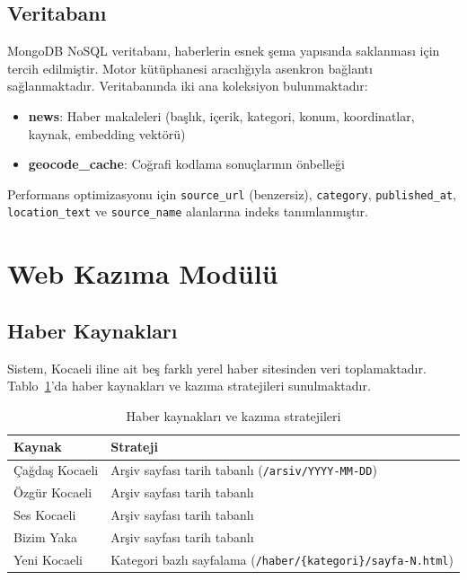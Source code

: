 \documentclass[conference]{IEEEtran}
\begin{document}
\subsection{Veritabanı}

MongoDB NoSQL veritabanı, haberlerin esnek şema yapısında saklanması için tercih edilmiştir. Motor kütüphanesi aracılığıyla asenkron bağlantı sağlanmaktadır. Veritabanında iki ana koleksiyon bulunmaktadır:

\begin{itemize}[leftmargin=*]
    \item \textbf{news}: Haber makaleleri (başlık, içerik, kategori, konum, koordinatlar, kaynak, embedding vektörü)
    \item \textbf{geocode\_cache}: Coğrafi kodlama sonuçlarının önbelleği
\end{itemize}

Performans optimizasyonu için \texttt{source\_url} (benzersiz), \texttt{category}, \texttt{published\_at}, \texttt{location\_text} ve \texttt{source\_name} alanlarına indeks tanımlanmıştır.

\section{Web Kazıma Modülü}
\label{sec:scraping}

\subsection{Haber Kaynakları}

Sistem, Kocaeli iline ait beş farklı yerel haber sitesinden veri toplamaktadır. Tablo~\ref{tab:kaynaklar}'da haber kaynakları ve kazıma stratejileri sunulmaktadır.

\begin{table}[H]
\centering
\caption{Haber kaynakları ve kazıma stratejileri}
\label{tab:kaynaklar}
\begin{tabular}{@{}p{2.5cm}p{5cm}@{}}
\toprule
\textbf{Kaynak} & \textbf{Strateji} \\
\midrule
Çağdaş Kocaeli & Arşiv sayfası tarih tabanlı (\texttt{/arsiv/YYYY-MM-DD}) \\
Özgür Kocaeli & Arşiv sayfası tarih tabanlı \\
Ses Kocaeli & Arşiv sayfası tarih tabanlı \\
Bizim Yaka & Arşiv sayfası tarih tabanlı \\
Yeni Kocaeli & Kategori bazlı sayfalama (\texttt{/haber/\{kategori\}/sayfa-N.html}) \\
\bottomrule
\end{tabular}
\end{table}
\end{document}
